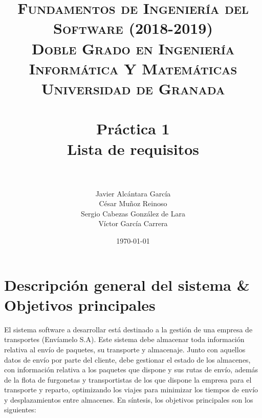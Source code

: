 



\title{	
\normalfont \normalsize 
\textsc{\textbf{Fundamentos de Ingeniería del Software (2018-2019)} \\ Doble Grado en Ingeniería Informática Y Matemáticas \\ Universidad de Granada} \\ [25pt] %
\horrule{0.5pt} \\[0.4cm] %
\huge \textbf{Práctica 1} \\ Lista de requisitos \\ %
\horrule{2pt} \\[0.5cm] %
}

\author{Javier Alcántara García\\ César Muñoz Reinoso \\ Sergio Cabezas González de Lara \\ Víctor García Carrera} %

\date{\normalsize\today} %





\maketitle %

\newpage %

\tableofcontents %

\newpage


\section{Descripción general del sistema \& Objetivos principales}
El sistema software a desarrollar está destinado a la gestión de una empresa de transportes (Envíamelo S.A). Este sistema debe almacenar toda información relativa al envío de paquetes, su transporte y almacenaje. Junto con aquellos datos de envío por parte del cliente, debe gestionar el estado de los almacenes, con información relativa a los paquetes que dispone y sus rutas de envío, además de la flota de furgonetas y transportistas de los que dispone la empresa para el transporte y reparto, optimizando los viajes para minimizar los tiempos de envío y desplazamientos entre almacenes.
En síntesis, los objetivos principales son los siguientes:

